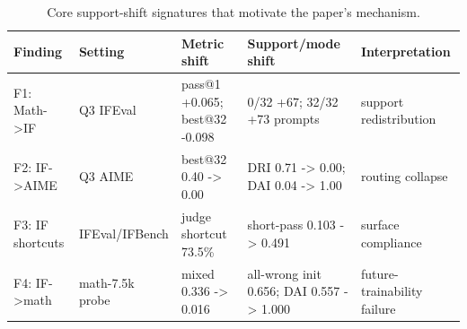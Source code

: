 \begin{table}[t]
\centering
\small
\caption{Core support-shift signatures that motivate the paper's mechanism.}
\label{tab:core-support-shift}
\begin{tabular}{lllll}
\toprule
Finding & Setting & Metric shift & Support/mode shift & Interpretation \\
\midrule
F1: Math->IF & Q3 IFEval & pass@1 +0.065; best@32 -0.098 & 0/32 +67; 32/32 +73 prompts & support redistribution \\
F2: IF->AIME & Q3 AIME & best@32 0.40 -> 0.00 & DRI 0.71 -> 0.00; DAI 0.04 -> 1.00 & routing collapse \\
F3: IF shortcuts & IFEval/IFBench & judge shortcut 73.5\% & short-pass 0.103 -> 0.491 & surface compliance \\
F4: IF->math & math-7.5k probe & mixed 0.336 -> 0.016 & all-wrong init 0.656; DAI 0.557 -> 1.000 & future-trainability failure \\
\bottomrule
\end{tabular}
\end{table}
